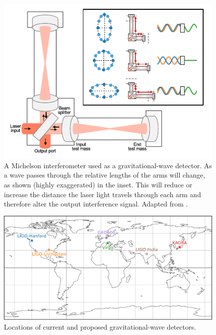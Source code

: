 \begin{colsection}
\begin{colsection}
\begin{figure}[p]
    \begin{center}
        \includegraphics[width=0.75\linewidth]{images/detector.pdf}
    \end{center}
    \caption[A Michelson interferometer used as a gravitational-wave detector]{
        A Michelson interferometer used as a gravitational-wave detector. As a wave passes through the relative lengths of the arms will change, as shown (highly exaggerated) in the inset. This will reduce or increase the distance the laser light travels through each arm and therefore alter the output interference signal. Adapted from \citet{GW150914_detectors}.
        }\label{fig:detector}
\end{figure}

\begin{figure}[p]
    \begin{center}
        \includegraphics[width=0.95\linewidth]{images/global.pdf}
    \end{center}
    \caption[Locations of gravitational-wave detectors]{
        Locations of current and proposed gravitational-wave detectors.
        }\label{fig:global}
\end{figure}


\end{colsection}
\end{colsection}
